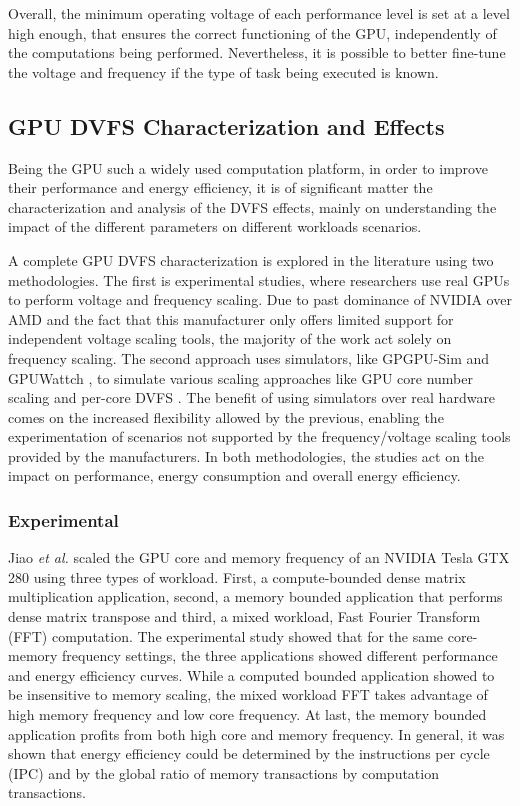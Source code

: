 Overall, the minimum operating voltage of each performance level is set at a level high enough, that ensures the correct functioning of the GPU, independently of the computations being performed. Nevertheless, it is possible to better fine-tune the voltage and frequency if the type of task being executed is known.

\subsection{GPU DVFS Characterization and Effects}

Being the GPU such a widely used computation platform, in order to improve their performance and energy efficiency, it is of significant matter the characterization and analysis of the DVFS effects, mainly on understanding the impact of the different parameters on different workloads scenarios. 

A complete GPU DVFS characterization is explored in the literature using two methodologies. The first is experimental studies, where researchers use real GPUs to perform voltage and frequency scaling. Due to past dominance of NVIDIA over AMD \cite{noauthor_jon_nodate} \cite{mujtaba_amd_2019} and the fact that this manufacturer only offers limited support for independent voltage scaling tools, the majority of the work act solely on frequency scaling. The second approach uses simulators, like GPGPU-Sim \cite{noauthor_gpgpu-sim/gpgpu-sim_distribution_2019} and GPUWattch \cite{noauthor_gpu_nodate} \cite{leng_gpuwattch:_2013},  to simulate various scaling approaches like GPU core number scaling and per-core DVFS \cite{mei_survey_2016}. The benefit of using simulators over real hardware comes on the increased flexibility allowed by the previous, enabling the experimentation of scenarios not supported by the frequency/voltage scaling tools provided by the manufacturers. In both methodologies, the studies act on the impact on performance, energy consumption and overall energy efficiency.

\subsubsection{Experimental}

Jiao \textit{et al.} \cite{jiao_power_2010} scaled the GPU core and memory frequency of an NVIDIA Tesla GTX 280 using three types of workload. First, a compute-bounded dense matrix multiplication application, second, a memory bounded application that performs dense matrix transpose and third, a mixed workload, Fast Fourier Transform (FFT) computation. The experimental study showed that for the same core-memory frequency settings, the three applications showed different performance and energy efficiency curves. While a computed bounded application showed to be insensitive to memory scaling, the mixed workload FFT takes advantage of high memory frequency and low core frequency. At last, the memory bounded application profits from both high core and memory frequency. In general, it was shown that energy efficiency could be determined by the instructions per cycle (IPC) and by the global ratio of memory transactions by computation transactions.

